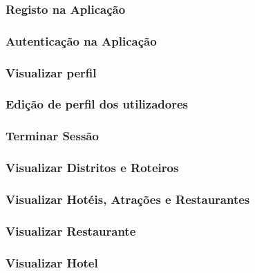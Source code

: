\documentclass[
  oneside,
  11pt, a4paper,
  footinclude=true,
  headinclude=true,
  cleardoublepage=empty
]{scrbook}
\begin{document}
        \subsubsection{Registo na Aplicação}
        
        
        \subsubsection{Autenticação na Aplicação}
        
        
        \subsubsection{Visualizar perfil}
        
        
        \subsubsection{Edição de perfil dos utilizadores}
        
        
        \subsubsection{Terminar Sessão}
        
        
        \subsubsection{Visualizar Distritos e Roteiros}
        
        
        \subsubsection{Visualizar Hotéis, Atrações e Restaurantes}
        
        
        \subsubsection{Visualizar Restaurante}
        
        
        \subsubsection{Visualizar Hotel}
        
        
\end{document}
